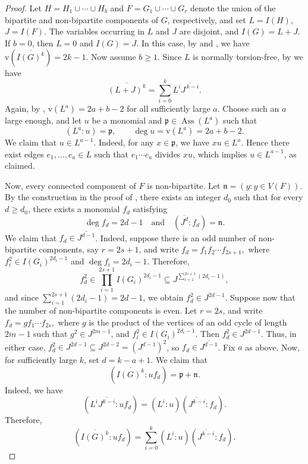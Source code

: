 \documentclass[11pt,reqno,a4paper]{amsart}
\theoremstyle{definition}
\begin{document}
\begin{proof}
Let \(H = H_1 \cup \cdots \cup H_b\) and \(F = G_1 \cup \cdots \cup G_r\) denote the union of the bipartite and non-bipartite components of \(G\), respectively, and set \(L = I(H)\), \(J = I(F)\). The variables occurring in \(L\) and \(J\) are disjoint, and \(I(G) = L + J\). If \(b = 0\), then \(L = 0\) and \(I(G) = J\). In this case, by \cite[Lemma 3.4]{MauTrung21} and  \cite[Lemma 3.1]{BiswasMandalSaha26}, we have
\(
\mathrm{v}(\overline{I(G)^k}) = 2k - 1.
\) Now assume \(b \ge 1\). Since \(L\) is normally torsion-free, by \cite[Theorem 2.1]{MauTrung21} we have
\[
\overline{(L + J)^k} =  \sum_{i=0}^k L^i \overline{J^{\,k-i}}.
\]
Again, by \cite[Corollary 5.4]{FicarraMarques25}, \(\mathrm{v}(L^a) = 2a + b - 2\) for all sufficiently large \(a\). Choose such an \(a\) large enough, and let \(u\) be a monomial and \(\mathfrak{p} \in \operatorname{Ass}(L^a)\) such that
\[
(L^a : u) = \mathfrak{p}, \qquad \deg u = \mathrm{v}(L^a) = 2a + b - 2.
\]
We claim that \(u \in L^{a-1}\). Indeed, for any \(x \in \mathfrak{p}\), we have \(xu \in L^a\). Hence there exist edges \(e_1,\ldots,e_a \in L\) such that \(e_1\cdots e_a\) divides \(xu\), which implies \(u \in L^{a-1}\), as claimed.


Now, every connected component of \(F\) is non-bipartite. Let \(\mathfrak{n} = (y : y \in V(F))\). By the construction in the proof of \cite[Lemma 3.4]{MauTrung21}, there exists an integer \(d_0\) such that for every \(d \ge d_0\), there exists a monomial \(f_d\) satisfying
\[
\deg f_d = 2d - 1 \quad \text{and} \quad (\overline{J^d} : f_d) = \mathfrak{n}.
\]
We claim that \(f_d \in \overline{J^{d-1}}\). Indeed, suppose there is an odd number of non-bipartite components, say \(r = 2s + 1\), and write
\(
f_d = f_1 f_2 \cdots f_{2s+1},
\)
where \(f_i^2 \in I(G_i)^{2d_i - 1}\) and \(\deg f_i = 2d_i - 1\). Therefore,
\[
f_d^2 \in \prod_{i=1}^{2s+1} I(G_i)^{2d_i - 1} \subseteq J^{\sum_{i=1}^{2s+1} (2d_i - 1)},
\]
and since \(\sum_{i=1}^{2s+1} (2d_i - 1) = 2d - 1\), we obtain \(f_d^2 \in J^{2d-1}\). 
Suppose now that the number of non-bipartite components is even. Let \(r = 2s\), and write
\(
f_d = g f_1 \cdots f_{2s},
\)
where \(g\) is the product of the vertices of an odd cycle of length \(2m-1\) such that \(g^2 \in J^{2m-1}\), and \(f_i^2 \in I(G_i)^{2d_i-1}\). Then
\(
f_d^2 \in J^{2d-1}.
\)
Thus, in either case, \(f_d^2 \in J^{2d-1} \subseteq J^{2d-2} = (J^{d-1})^2\), so \(f_d \in \overline{J^{d-1}}\).
Fix \(a\) as above. Now, for sufficiently large \(k\), set \(d = k - a + 1\). We claim that
\[
(\overline{I(G)^k} : u f_d) = \mathfrak{p} + \mathfrak{n}.
\]
Indeed, we have
\[
(L^i \overline{J^{k-i}} : u f_d) = (L^i : u)(\overline{J^{k-i}} : f_d).
\]
Therefore,
\[
(\overline{I(G)^k} : u f_d) = \sum_{i=0}^{k} (L^i : u)(\overline{J^{k-i}} : f_d).
\]


\end{proof}
\end{document}
